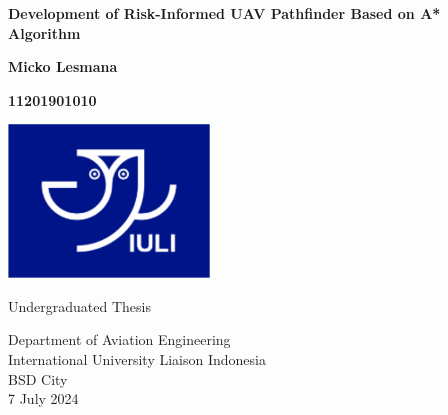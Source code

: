 \documentclass[12pt]{report}
\begin{document}
     \begin{titlepage}
        \begin{center}
            \textbf{\LARGE Development of Risk-Informed UAV Pathfinder Based on A* Algorithm}
    
            \vspace{0.5cm}
            
                
            \textbf{\Large Micko Lesmana}
            \vspace{0.5cm}

            \textbf{\Large 11201901010}
            \vspace{3.5cm}  

            \includegraphics[width=0.4\textwidth]{General Image/IULISymbol.PNG}
            \vspace{3.5cm}


            \large Undergraduated Thesis\\
                
            \vspace{0.8cm}
                
            Department of Aviation Engineering\\
            International University Liaison Indonesia\\
            BSD City\\
            7 July 2024
                
        \end{center}
    \end{titlepage}
\end{document}
